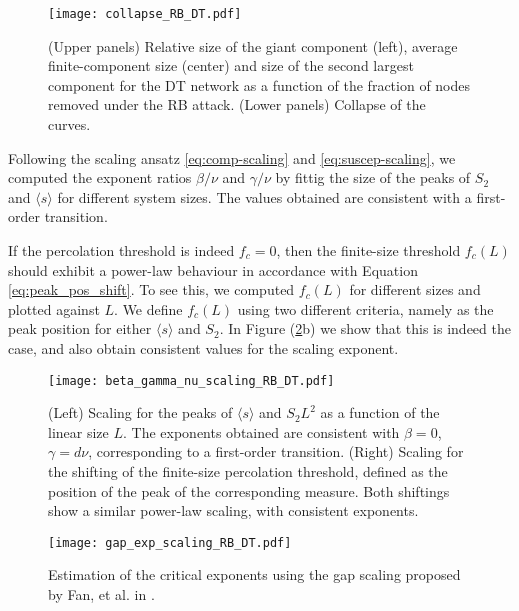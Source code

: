\documentclass{article}
\begin{document}
\begin{figure}[h]
\centering
\texttt{[image: collapse\_RB\_DT.pdf]}
\caption{\label{fig:collapse_RB_DT} (Upper panels) Relative size of the giant component (left), average finite-component size (center) and size of the second largest component for the DT network as a function of the fraction of nodes removed under the RB attack. (Lower panels) Collapse of the curves.}
\end{figure}


Following the scaling ansatz \ref{eq:comp-scaling} and \ref{eq:suscep-scaling}, we computed the exponent ratios $\beta / \nu$ and $\gamma / \nu$ by fittig the size of the peaks of $S_2$ and $\langle s \rangle$ for different system sizes. The values obtained are consistent with a first-order transition. 



If the percolation threshold is indeed $f_c = 0$, then the finite-size threshold $f_c(L)$ should exhibit a power-law behaviour in accordance with Equation \ref{eq:peak_pos_shift}. To see this, we computed $f_c(L)$ for different sizes and plotted against $L$. We define $f_c(L)$ using two different criteria, namely as the peak position for either $\langle s \rangle$ and $S_2$. In Figure (\ref{fig:exponents}b) we show that this is indeed the case, and also obtain consistent values for the scaling exponent.


\begin{figure}[h]
\centering
\texttt{[image: beta\_gamma\_nu\_scaling\_RB\_DT.pdf]}
\caption{\label{fig:exponents}(Left) Scaling for the peaks of $\langle s \rangle$ and $S_2 L^2$ as a function of the linear size $L$. The exponents obtained are consistent with $\beta =0$, $\gamma = d\nu$, corresponding to a first-order transition. (Right) Scaling for the shifting of the finite-size percolation threshold, defined as the position of the peak of the corresponding measure. Both shiftings show a similar power-law scaling, with consistent exponents.}
\end{figure}





\begin{figure}[h]
\centering
\texttt{[image: gap\_exp\_scaling\_RB\_DT.pdf]}
\caption{\label{fig:gap_exp} Estimation of the critical exponents using the gap scaling proposed by Fan, et al. in \cite{Fan2020}.}
\end{figure}
\end{document}

